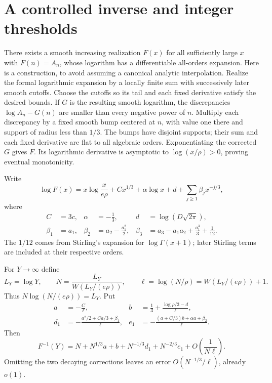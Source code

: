 \documentclass[11pt]{article}
\theoremstyle{remark}\newtheorem{remark}[theorem]{Remark}
\begin{document}
\section{A controlled inverse and integer thresholds}\label{vav:sec:inverse}

There exists a smooth increasing realization $F(x)$ for all sufficiently
large $x$ with $F(n)=A_n$, whose logarithm has a differentiable all-orders
expansion. Here is a construction, to avoid assuming a canonical
analytic interpolation. Realize the formal logarithmic expansion by
a locally finite sum with successively later smooth cutoffs. Choose
the cutoffs so its tail and each fixed derivative satisfy the desired
bounds. If $G$ is the resulting smooth logarithm, the discrepancies
$\log A_n-G(n)$ are smaller than every negative power of $n$.
Multiply each discrepancy by a fixed smooth bump centered at $n$,
with value one there and support of radius less than $1/3$.
The bumps have disjoint supports; their sum and each fixed derivative
are flat to all algebraic orders. Exponentiating the corrected $G$
gives $F$. Its logarithmic derivative is asymptotic to
$\log(x/\rho)>0$, proving eventual monotonicity.

Write
\begin{equation}\label{vav:eq:logasym}
 \log F(x)=x\log\frac{x}{e\rho}+Cx^{1/3}
    +\alpha\log x+d+\sum_{j\ge1}\beta_jx^{-j/3},
\end{equation}
where
\begin{align*}
 C&=3c,&\alpha&=-\frac13,&d&=\log(D\sqrt{2\pi}),\\
 \beta_1&=a_1,&\beta_2&=a_2-\frac{a_1^2}{2},&
 \beta_3&=a_3-a_1a_2+\frac{a_1^3}{3}+\frac1{12}.
\end{align*}
The $1/12$ comes from Stirling's expansion for $\log\Gamma(x+1)$;
later Stirling terms are included at their respective orders.

For $Y\to\infty$ define
\begin{equation}\label{vav:eq:N}
 L_Y=\log Y,\qquad N=\frac{L_Y}{W(L_Y/(e\rho))},\qquad
 \ell=\log(N/\rho)=W(L_Y/(e\rho))+1.
\end{equation}
Thus $N\log(N/(e\rho))=L_Y$. Put
\begin{align}
 a&=-\frac C\ell,&
 b&=\frac13+\frac{\log\rho/3-d}{\ell},\label{vav:eq:inverseab}\\
 d_1&=-\frac{a^2/2+Ca/3+\beta_1}{\ell},&
 e_1&=-\frac{(a+C/3)b+\alpha a+\beta_2}{\ell}.
 \label{vav:eq:inversede}
\end{align}
Then
\begin{equation}\label{vav:eq:inverse}
 F^{-1}(Y)=N+N^{1/3}a+b+N^{-1/3}d_1+N^{-2/3}e_1
                           +O\left(\frac1{N\ell}\right).
\end{equation}
Omitting the two decaying corrections leaves an error
$O(N^{-1/3}/\ell)$, already $o(1)$.
\end{document}
